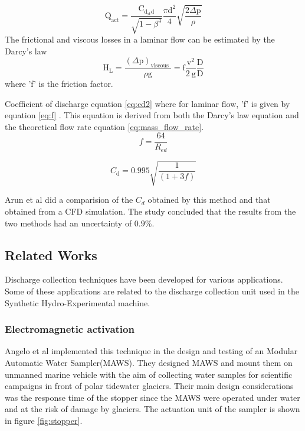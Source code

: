 \begin{equation}
\mathrm{Q}_{\mathrm{act}}=\frac{\mathrm{C}_{\mathrm{d}_{\mathrm{st}} \mathrm{d}}}{\sqrt{1-\beta^{4}}} \frac{\pi \mathrm{d}^{2}}{4} \sqrt{\frac{2 \Delta \mathrm{p}}{\rho}}
\end{equation}
The frictional and viscous losses in a laminar flow can be estimated by the Darcy's law
\begin{equation}
\mathrm{H}_{\mathrm{L}}=\frac{(\Delta \mathrm{p})_{\text {viscous }}}{\rho \mathrm{g}}=\mathrm{f} \frac{\mathrm{v}^{2}}{2 \mathrm{~g}} \frac{\mathrm{D}}{\mathrm{D}}
\end{equation}
where 'f' is the friction factor.
\par
Coefficient of discharge equation \ref{eq:cd2} where for laminar flow, 'f' is given by equation \ref{eq:f} . This equation is derived from both the Darcy's law equation and the theoretical flow rate equation \ref{eq:mass_flow_rate}.
\begin{equation}
f=\frac{64}{R_{e d}}
\label{eq:f}
\end{equation}


\begin{equation}
C_{\mathrm{d}}=0.995 \sqrt{\frac{1}{(1+3 f)}}
\label{eq:cd2}
\end{equation}

\par
Arun et al \cite{arun2015prediction} did  a comparision of the $C_{d}$ obtained by this method and that obtained from a CFD simulation. The study concluded that the results from the two methods had an uncertainty of $0.9\%$.
\subsection{Related Works}
Discharge collection techniques have been developed for various applications. Some of these applications are related to the discharge collection unit used in the Synthetic Hydro-Experimental machine.

\subsubsection{Electromagnetic activation}
Angelo et al \cite{odetti2019design} implemented this technique in the design and testing of an Modular Automatic Water Sampler(MAWS). They designed MAWS and mount them on unmanned marine vehicle with the aim of collecting water samples for scientific campaigns in front of polar tidewater glaciers. Their main design considerations was the response time of the stopper since the MAWS were operated under water and at the risk of damage by glaciers. The actuation unit of the sampler is shown in figure \ref{fig:stopper}. 

